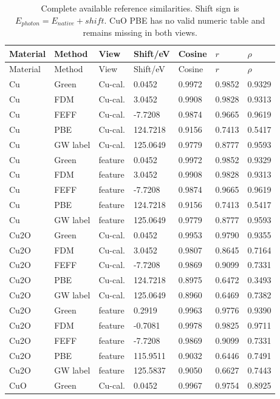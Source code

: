 \documentclass[11pt,a4paper]{article}
\begin{document}
\begingroup\footnotesize\setlength{\tabcolsep}{3pt}
\begin{longtable}{lllllll}
\caption{Complete available reference similarities. Shift sign is $E_{photon}=E_{native}+shift$. CuO PBE has no valid numeric table and remains missing in both views.}\\
\toprule
Material & Method & View & Shift/eV & Cosine & $r$ & $\rho$\\\midrule\endfirsthead
Material & Method & View & Shift/eV & Cosine & $r$ & $\rho$\\\midrule\endhead
Cu & Green & Cu-cal. & 0.0452 & 0.9972 & 0.9852 & 0.9329\\
Cu & FDM & Cu-cal. & 3.0452 & 0.9908 & 0.9828 & 0.9313\\
Cu & FEFF & Cu-cal. & -7.7208 & 0.9874 & 0.9665 & 0.9619\\
Cu & PBE & Cu-cal. & 124.7218 & 0.9156 & 0.7413 & 0.5417\\
Cu & GW label & Cu-cal. & 125.0649 & 0.9779 & 0.8777 & 0.9593\\
Cu & Green & feature & 0.0452 & 0.9972 & 0.9852 & 0.9329\\
Cu & FDM & feature & 3.0452 & 0.9908 & 0.9828 & 0.9313\\
Cu & FEFF & feature & -7.7208 & 0.9874 & 0.9665 & 0.9619\\
Cu & PBE & feature & 124.7218 & 0.9156 & 0.7413 & 0.5417\\
Cu & GW label & feature & 125.0649 & 0.9779 & 0.8777 & 0.9593\\
Cu2O & Green & Cu-cal. & 0.0452 & 0.9953 & 0.9790 & 0.9355\\
Cu2O & FDM & Cu-cal. & 3.0452 & 0.9807 & 0.8645 & 0.7164\\
Cu2O & FEFF & Cu-cal. & -7.7208 & 0.9869 & 0.9099 & 0.7331\\
Cu2O & PBE & Cu-cal. & 124.7218 & 0.8975 & 0.6472 & 0.3493\\
Cu2O & GW label & Cu-cal. & 125.0649 & 0.8960 & 0.6469 & 0.7382\\
Cu2O & Green & feature & 0.2919 & 0.9963 & 0.9776 & 0.9390\\
Cu2O & FDM & feature & -0.7081 & 0.9978 & 0.9825 & 0.9711\\
Cu2O & FEFF & feature & -7.7208 & 0.9869 & 0.9099 & 0.7331\\
Cu2O & PBE & feature & 115.9511 & 0.9032 & 0.6446 & 0.7491\\
Cu2O & GW label & feature & 125.5837 & 0.9050 & 0.6627 & 0.7443\\
CuO & Green & Cu-cal. & 0.0452 & 0.9967 & 0.9754 & 0.8925\\

\end{longtable}
\end{document}
